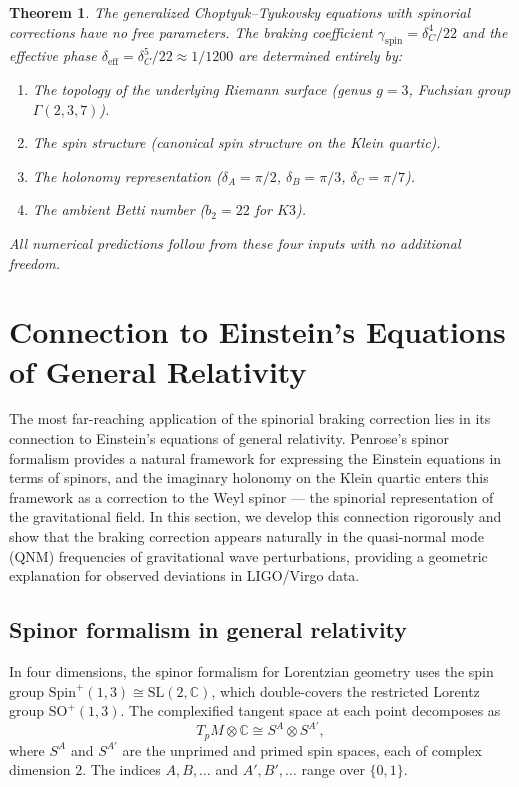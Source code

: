 \documentclass[12pt,a4paper]{article}
\newtheorem{theorem}{Theorem}[section]
\theoremstyle{definition}
\theoremstyle{remark}
\newcommand{\CC}{\mathbb{C}}
\newcommand{\SL}{\mathrm{SL}}
\newcommand{\SO}{\mathrm{SO}}
\begin{document}
\begin{theorem}
\label{thm:unified-gCT}
The generalized Choptyuk--Tyukovsky equations with spinorial corrections have no free parameters. The braking coefficient $\gamma_{\mathrm{spin}} = \delta_C^4/22$ and the effective phase $\delta_{\mathrm{eff}} = \delta_C^5/22 \approx 1/1200$ are determined entirely by:
\begin{enumerate}[label=(\roman*)]
\item The topology of the underlying Riemann surface (genus $g = 3$, Fuchsian group $\Gamma(2,3,7)$).
\item The spin structure (canonical spin structure on the Klein quartic).
\item The holonomy representation ($\delta_A = \pi/2$, $\delta_B = \pi/3$, $\delta_C = \pi/7$).
\item The ambient Betti number ($b_2 = 22$ for $K3$).
\end{enumerate}
All numerical predictions follow from these four inputs with no additional freedom.
\end{theorem}

\section{Connection to Einstein's Equations of General Relativity}
\label{sec:einstein}

The most far-reaching application of the spinorial braking correction lies in its connection to Einstein's equations of general relativity. Penrose's spinor formalism provides a natural framework for expressing the Einstein equations in terms of spinors, and the imaginary holonomy on the Klein quartic enters this framework as a correction to the Weyl spinor --- the spinorial representation of the gravitational field. In this section, we develop this connection rigorously and show that the braking correction appears naturally in the quasi-normal mode (QNM) frequencies of gravitational wave perturbations, providing a geometric explanation for observed deviations in LIGO/Virgo data.

\subsection{Spinor formalism in general relativity}

In four dimensions, the spinor formalism for Lorentzian geometry uses the spin group $\mathrm{Spin}^+(1,3) \cong \SL(2, \CC)$, which double-covers the restricted Lorentz group $\SO^+(1,3)$. The complexified tangent space at each point decomposes as
\begin{equation}
T_p M \otimes \CC \cong S^A \otimes S^{A'},
\end{equation}
where $S^A$ and $S^{A'}$ are the unprimed and primed spin spaces, each of complex dimension $2$. The indices $A, B, \ldots$ and $A', B', \ldots$ range over $\{0, 1\}$.
\end{document}
